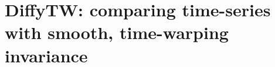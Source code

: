 \chapter[DiffyTW: comparing time-series with smooth, time-warping invariance]{DiffyTW: comparing time-series with smooth, time-warping invariance}\label{ch:diffytw}



\begin{subappendices}

\end{subappendices}
